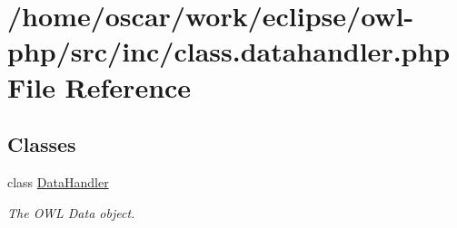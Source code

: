 \hypertarget{class_8datahandler_8php}{
\section{/home/oscar/work/eclipse/owl-php/src/inc/class.datahandler.php File Reference}
\label{class_8datahandler_8php}
}
\subsection*{Classes}
\begin{CompactItemize}
\item 
class \hyperlink{classDataHandler}{DataHandler}
\begin{CompactList}\small\item\em The OWL Data object. \item\end{CompactList}\end{CompactItemize}
